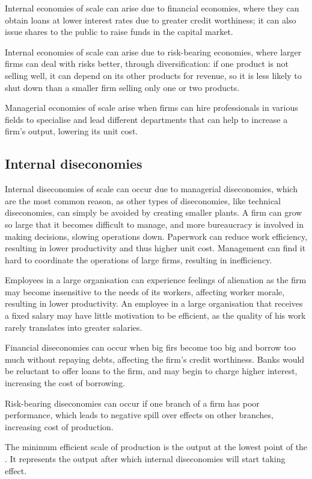 \documentclass[Economics.tex]{subfiles}
\begin{document}
Internal economies of scale can arise due to financial economies, where they can obtain loans at lower interest rates due to greater credit worthiness; it can also issue shares to the public to raise funds in the capital market.

Internal economies of scale can arise due to risk-bearing economies, where larger firms can deal with risks better, through diversification: if one product is not selling well, it can depend on its other products for revenue, so it is less likely to shut down than a smaller firm selling only one or two products.

Managerial economies of scale arise when firms can hire professionals in various fields to specialise and lead different departments that can help to increase a firm's output, lowering its unit cost.
\subsection{Internal diseconomies}
Internal diseconomies of scale can occur due to managerial diseconomies, which are the most common reason, as other types of diseconomies, like technical diseconomies, can simply be avoided by creating smaller plants. A firm can grow so large that it becomes difficult to manage, and more bureaucracy is involved in making decisions, slowing operations down. Paperwork can reduce work efficiency, resulting in lower productivity and thus higher unit cost. Management can find it hard to coordinate the operations of large firms, resulting in inefficiency.

Employees in a large organisation can experience feelings of alienation as the firm may become insensitive to the needs of its workers, affecting worker morale, resulting in lower productivity. An employee in a large organisation that receives a fixed salary may have little motivation to be efficient, as the quality of his work rarely translates into greater salaries.

Financial diseconomies can occur when big firs become too big and borrow too much without repaying debts, affecting the firm's credit worthiness. Banks would be reluctant to offer loans to the firm, and may begin to charge higher interest, increasing the cost of borrowing.

Risk-bearing diseconomies can occur if one branch of a firm has poor performance, which leads to negative spill over effects on other branches, increasing cost of production.

The minimum efficient scale of production is the output at the lowest point of the . It represents the output after which internal diseconomies will start taking effect.
\end{document}
